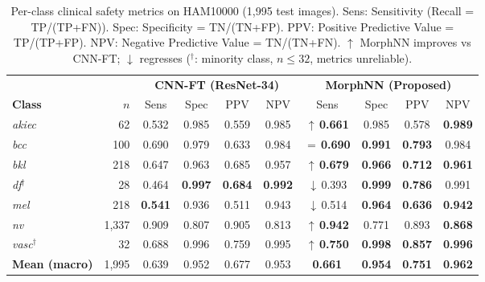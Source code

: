 \documentclass[preprint,12pt]{elsarticle}
\begin{document}
\begin{table}[htbp]
\centering
\caption{Per-class clinical safety metrics on HAM10000 (1,995 test images).
  Sens: Sensitivity (Recall = TP/(TP+FN)).
  Spec: Specificity = TN/(TN+FP).
  PPV: Positive Predictive Value = TP/(TP+FP).
  NPV: Negative Predictive Value = TN/(TN+FN).
  $\uparrow$ MorphNN improves vs CNN-FT; $\downarrow$ regresses
  ($^\dagger$: minority class, $n \leq 32$, metrics unreliable).}
\label{tab:sensitivity_ham}
\setlength{\tabcolsep}{4pt}
\renewcommand{\arraystretch}{1.12}
\begin{tabular}{lrcccc|cccc}
\toprule
 & &
  \multicolumn{4}{c|}{\textbf{CNN-FT (ResNet-34)}} &
  \multicolumn{4}{c}{\textbf{MorphNN (Proposed)}} \\
\textbf{Class} & \textbf{$n$} &
  Sens & Spec & PPV & NPV &
  Sens & Spec & PPV & NPV \\
\midrule
\textit{akiec} & 62 &
  0.532 & 0.985 & 0.559 & 0.985 &
  $\uparrow$\,\textbf{0.661} & 0.985 & 0.578 & \textbf{0.989} \\
\textit{bcc}   & 100 &
  0.690 & 0.979 & 0.633 & 0.984 &
  $=$\,\textbf{0.690} & \textbf{0.991} & \textbf{0.793} & 0.984 \\
\textit{bkl}   & 218 &
  0.647 & 0.963 & 0.685 & 0.957 &
  $\uparrow$\,\textbf{0.679} & \textbf{0.966} & \textbf{0.712} & \textbf{0.961} \\
\textit{df}$^\dagger$ & 28 &
  0.464 & \textbf{0.997} & \textbf{0.684} & \textbf{0.992} &
  $\downarrow$\,0.393 & \textbf{0.999} & \textbf{0.786} & 0.991 \\
\textit{mel}   & 218 &
  \textbf{0.541} & 0.936 & 0.511 & 0.943 &
  $\downarrow$\,0.514 & \textbf{0.964} & \textbf{0.636} & \textbf{0.942} \\
\textit{nv}    & 1{,}337 &
  0.909 & 0.807 & 0.905 & 0.813 &
  $\uparrow$\,\textbf{0.942} & 0.771 & 0.893 & \textbf{0.868} \\
\textit{vasc}$^\dagger$ & 32 &
  0.688 & 0.996 & 0.759 & 0.995 &
  $\uparrow$\,\textbf{0.750} & \textbf{0.998} & \textbf{0.857} & \textbf{0.996} \\
\midrule
\textbf{Mean (macro)} & 1{,}995 &
  0.639 & 0.952 & 0.677 & 0.953 &
  \textbf{0.661} & \textbf{0.954} & \textbf{0.751} & \textbf{0.962} \\
\bottomrule
\end{tabular}
\end{table}
\end{document}
